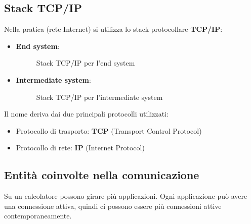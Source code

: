 \documentclass[a4paper]{article}
\begin{document}
\subsection{Stack TCP/IP}
Nella pratica (rete Internet) si utilizza lo stack protocollare \textbf{TCP/IP}:
\begin{itemize}
  \item \textbf{End system}:
    \begin{figure}[H]
      \centering
      \caption{Stack TCP/IP per l'end system}
    \end{figure}
  \item \textbf{Intermediate system}:
    \begin{figure}[H]
      \centering
      \caption{Stack TCP/IP per l'intermediate system}
    \end{figure}
\end{itemize}

\noindent
Il nome deriva dai due principali protocolli utilizzati:
\begin{itemize}
  \item Protocollo di trasporto: \textbf{TCP} (Transport Control Protocol)
  \item Protocollo di rete: \textbf{IP} (Internet Protocol)
\end{itemize}

\subsection{Entità coinvolte nella comunicazione}
Su un calcolatore possono girare più applicazioni. Ogni applicazione
può avere una connessione attiva, quindi ci possono essere più connessioni
attive contemporaneamente.
\end{document}
